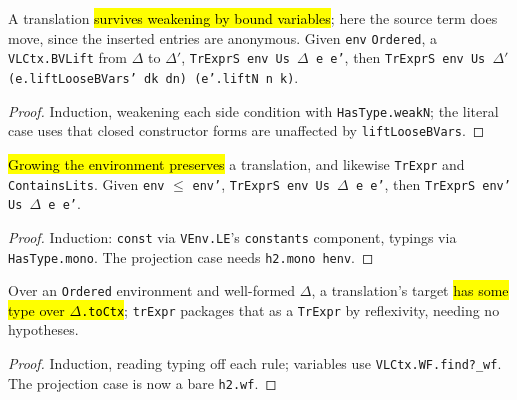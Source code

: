 \begin{theorem}
\label{thm:trexprs-weakbv}
\leanok
{}
 

 A translation \hl{survives weakening by bound variables}; here the source term does move, since the inserted entries are anonymous. Given \texttt{env} \texttt{Ordered}, a \texttt{VLCtx.BVLift} from $\Delta$ to $\Delta'$, \texttt{TrExprS env Us $\Delta$ e e'}, then \texttt{TrExprS env Us $\Delta'$ (e.liftLooseBVars' dk dn) (e'.liftN n k)}.
\end{theorem}
\begin{proof}
\leanok
{} Induction, weakening each side condition with \texttt{HasType.weakN}; the literal case uses that closed constructor forms are unaffected by \texttt{liftLooseBVars}.
\end{proof}

\begin{theorem}
\label{thm:trexprs-mono}
\leanok
{}
 

 \hl{Growing the environment preserves} a translation, and likewise \texttt{TrExpr} and \texttt{ContainsLits}. Given \texttt{env} $\le$ \texttt{env'}, \texttt{TrExprS env Us $\Delta$ e e'}, then \texttt{TrExprS env' Us $\Delta$ e e'}.
\end{theorem}
\begin{proof}
\leanok
{} Induction: \texttt{const} via \texttt{VEnv.LE}'s \texttt{constants} component, typings via \texttt{HasType.mono}. The projection case needs \texttt{h2.mono henv}.
\end{proof}

\begin{theorem}
\label{thm:trexprs-wf}
\leanok
{}
 

 Over an \texttt{Ordered} environment and well-formed $\Delta$, a translation's target \hl{has some type over $\Delta$\texttt{.toCtx}}; \texttt{trExpr} packages that as a \texttt{TrExpr} by reflexivity, needing no hypotheses.
\end{theorem}
\begin{proof}
\leanok
{} Induction, reading typing off each rule; variables use \texttt{VLCtx.WF.find?\_wf}. The projection case is now a bare \texttt{h2.wf}.
\end{proof}

